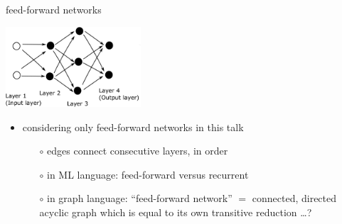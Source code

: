 \documentclass[xcolor={svgnames},
               hyperref={colorlinks,citecolor=DeepPink4,linkcolor=FireBrick,urlcolor=Maroon}]
               {beamer}
\begin{document}
\begin{frame}{feed-forward networks}

\begin{center}
\includegraphics[height=30mm]{figs/network}
\end{center}

\begin{itemize}
\item considering only \alert{feed-forward} networks in this talk
    \begin{itemize}
    \item[$\circ$] edges connect consecutive layers, in order
    \item[$\circ$] in ML language: feed-forward versus \alert{recurrent}
    \item[$\circ$] in graph language: ``feed-forward network'' $=$ connected, directed acyclic graph which is equal to its own transitive reduction \dots ?
    \end{itemize}
\end{itemize}
\end{frame}
\end{document}
